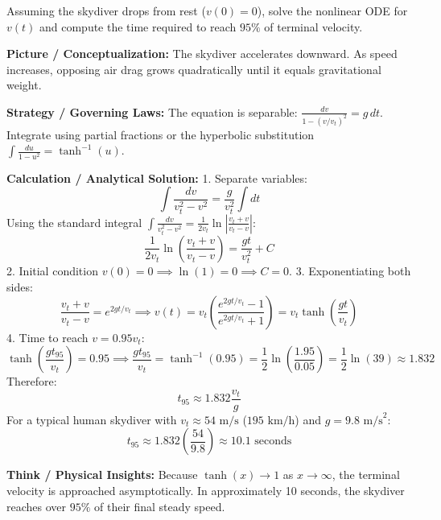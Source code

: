 \begin{psctexample}
Assuming the skydiver drops from rest ($v(0) = 0$), solve the nonlinear ODE for $v(t)$ and compute the time required to reach $95\%$ of terminal velocity.

\textbf{\color{rbruNavy}Picture / Conceptualization:}
The skydiver accelerates downward. As speed increases, opposing air drag grows quadratically until it equals gravitational weight.

\textbf{\color{rbruNavy}Strategy / Governing Laws:}
The equation is separable: $\frac{dv}{1 - (v/v_t)^2} = g\,dt$. Integrate using partial fractions or the hyperbolic substitution $\int \frac{du}{1 - u^2} = \tanh^{-1}(u)$.

\textbf{\color{rbruNavy}Calculation / Analytical Solution:}
1. Separate variables:
\begin{equation}
\int \frac{dv}{v_t^2 - v^2} = \frac{g}{v_t^2}\int dt
\end{equation}
Using the standard integral $\int \frac{dv}{v_t^2 - v^2} = \frac{1}{2v_t}\ln\left|\frac{v_t + v}{v_t - v}\right|$:
\begin{equation}
\frac{1}{2v_t}\ln\left(\frac{v_t + v}{v_t - v}\right) = \frac{gt}{v_t^2} + C
\end{equation}
2. Initial condition $v(0) = 0 \implies \ln(1) = 0 \implies C = 0$.
3. Exponentiating both sides:
\begin{equation}
\frac{v_t + v}{v_t - v} = e^{2gt/v_t} \implies v(t) = v_t\left(\frac{e^{2gt/v_t} - 1}{e^{2gt/v_t} + 1}\right) = v_t \tanh\left(\frac{gt}{v_t}\right)
\end{equation}
4. Time to reach $v = 0.95 v_t$:
\begin{equation}
\tanh\left(\frac{gt_{95}}{v_t}\right) = 0.95 \implies \frac{gt_{95}}{v_t} = \tanh^{-1}(0.95) = \frac{1}{2}\ln\left(\frac{1.95}{0.05}\right) = \frac{1}{2}\ln(39) \approx 1.832
\end{equation}
Therefore:
\begin{equation}
t_{95} \approx 1.832\frac{v_t}{g}
\end{equation}
For a typical human skydiver with $v_t \approx 54\text{ m/s}$ ($195\text{ km/h}$) and $g = 9.8\text{ m/s}^2$:
\begin{equation}
t_{95} \approx 1.832\left(\frac{54}{9.8}\right) \approx 10.1\text{ seconds}
\end{equation}

\textbf{\color{rbruNavy}Think / Physical Insights:}
Because $\tanh(x) \to 1$ as $x \to \infty$, the terminal velocity is approached asymptotically. In approximately 10 seconds, the skydiver reaches over $95\%$ of their final steady speed.
\qedexam
\end{psctexample}

